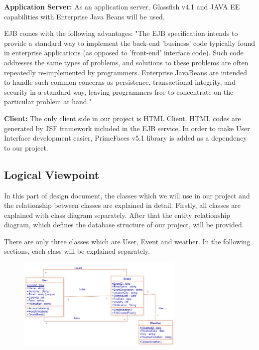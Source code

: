 \par\textbf{Application Server:} As an application server, Glassfish v4.1 and JAVA EE capabilities with Enterprise Java Beans will be used.
\par EJB comes with the following advantages: "The EJB specification intends to provide a standard way to implement the back-end 'business' code typically found in enterprise applications (as opposed to 'front-end' interface code). Such code addresses the same types of problems, and solutions to these problems are often repeatedly re-implemented by programmers. Enterprise JavaBeans are intended to handle such common concerns as persistence, transactional integrity, and security in a standard way, leaving programmers free to concentrate on the particular problem at hand."
\par \textbf{Client:} The only client side in our project is HTML Client. HTML codes are generated by JSF framework included in the EJB service. In order to make User Interface development easier, PrimeFaces v5.1 library is added as a dependency to our project.
\subsection{Logical Viewpoint}
\qquad In this part of design document, the classes which we will use in our project and the relationship between classes are explained in detail. Firstly, all classes are explained with class diagram separately. After that the entity relationship diagram, which defines the database structure of our project, will be provided.
\par There are only three classes which are User, Event and weather. In the following sections, each class will be explained separately.
\begin{figure}[tbh]
  \begin{center}
  \includegraphics[width=80mm]{logical}
  \end{center}
\end{figure}
